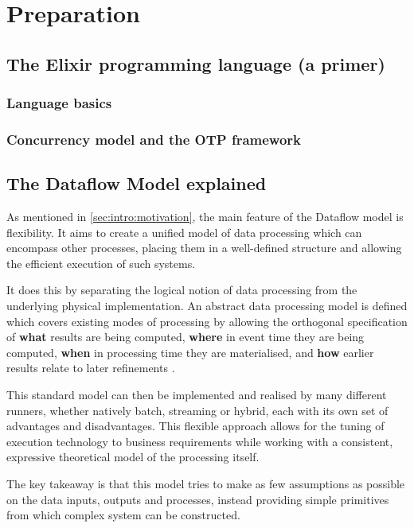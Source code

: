 \chapter{Preparation}\label{ch:prep}

\section{The Elixir programming language (a primer)}\label{sec:prep:elixir}

\subsection{Language basics}

\subsection{Concurrency model and the OTP framework}

\section{The Dataflow Model explained}\label{sec:prep:dataflow}

As mentioned in \cref{sec:intro:motivation}, the main feature of the Dataflow model is flexibility.
It aims to create a unified model of data processing which can encompass other processes, placing them in a well-defined structure and allowing the efficient execution of such systems.

It does this by separating the logical notion of data processing from the underlying physical implementation.
An abstract data processing model is defined which covers existing modes of processing by allowing the orthogonal specification of \textbf{what} results are being computed, \textbf{where} in event time they are being computed, \textbf{when} in processing time they are materialised, and \textbf{how} earlier results relate to later refinements \cite[p.~1793]{Akidau:2015}.

This standard model can then be implemented and realised by many different runners, whether natively batch, streaming or hybrid, each with its own set of advantages and disadvantages. 
This flexible approach allows for the tuning of execution technology to business requirements while working with a consistent, expressive theoretical model of the processing itself.

The key takeaway is that this model tries to make as few assumptions as possible on the data inputs, outputs and processes, instead providing simple primitives from which complex system can be constructed.

